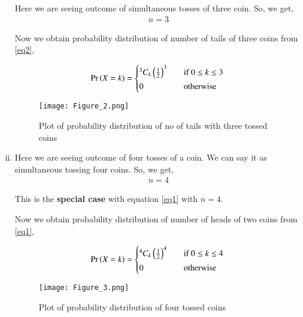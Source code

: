 \documentclass[journal,12pt,twocolumn]{IEEEtran}
\begin{document}
\begin{enumerate}[(i)]
Here we are seeing outcome of simultaneous tosses of three coin. So, we get,
\begin{align}
    n=3
\end{align}

Now we obtain probability distribution of number of tails of three coins from \eqref{eq2},

\begin{align}
   \pr{X=k} =
  \begin{cases*}
    {^3 C_k}\brak{\frac{1}{2}}^{3} \quad& if $0 \leq k \leq 3$ \\
    0 \quad& otherwise
  \end{cases*}
\end{align}

\begin{figure}[h!]
    \centering
    \texttt{[image: Figure\_2.png]}
    \caption{Plot of probability distribution of no of tails with three tossed coins}
    \label{fig:Three coins}
\end{figure}

\item

Here we are seeing outcome of four tosses of a coin. We can say it as simultaneous tossing four coins. So, we get,
\begin{align}
    n=4
\end{align}

This is the \textbf{special case} with equation \eqref{eq1} with $n=4$.

Now we obtain probability distribution of number of heads of two coins from \eqref{eq1},

\begin{align}
   \pr{X=k} =
  \begin{cases*}
    {^4 C_k}\brak{\frac{1}{2}}^{4} \quad& if $0 \leq k \leq 4$ \\
    0 \quad& otherwise
  \end{cases*}
\end{align}

\begin{figure}[h!]
    \centering
    \texttt{[image: Figure\_3.png]}
    \caption{Plot of probability distribution of four tossed coins}
    \label{fig:Four coins}
\end{figure}
\end{enumerate}

\vspace{2in}
\end{document}
